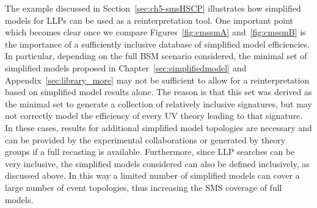 The example discussed in Section~\ref{sec:ch5-smsHSCP} illustrates how simplified
models for LLPs can be used as a reinterpretation tool. One important
point which becomes clear once we compare Figures~\ref{fig:cmssmA} and~\ref{fig:cmssmB} 
is the importance of a sufficiently inclusive database of simplified 
model efficiencies. In particular, depending on the full BSM scenario considered,
the minimal set of simplified models proposed in Chapter~\ref{sec:simplifiedmodel} and 
Appendix~\ref{sec:library_more} may not be sufficient to allow for a reinterpretation 
based on simplified model results alone. The reason is that this set was derived as the minimal
set to generate a collection of relatively inclusive signatures, but may not correctly model
the efficiency of every UV theory leading to that signature. In these cases, results for additional simplified 
model topologies are necessary and can be provided by the experimental collaborations or 
generated by theory groups if a full recasting is available.
Furthermore, since LLP searches can be very inclusive,
the simplified models considered can also be defined inclusively,
as discussed above. In this way a limited number of simplified models
can cover a large number of event topologies, thus increasing the
SMS coverage of full models.


